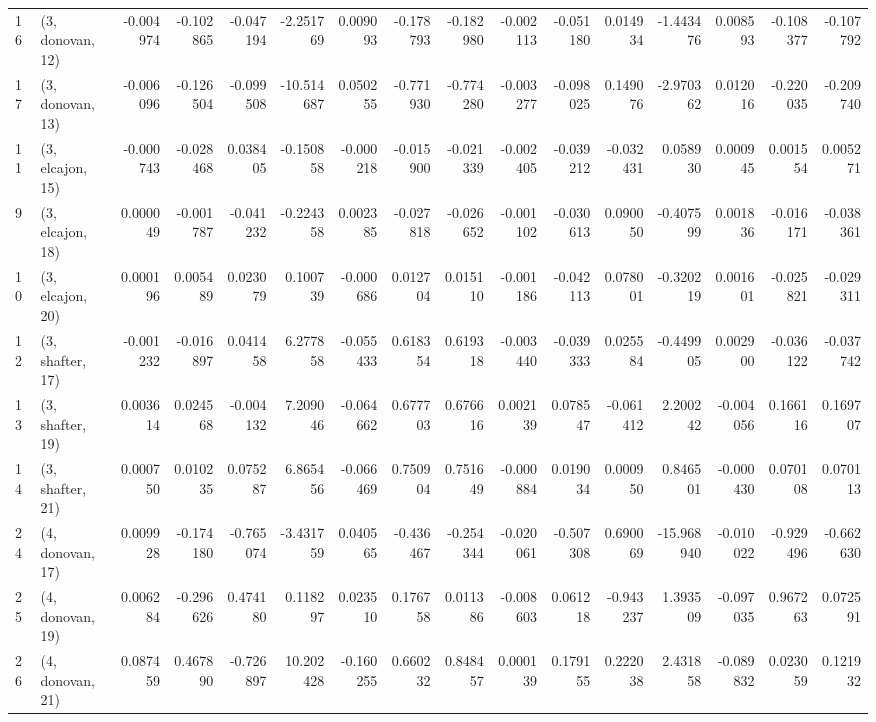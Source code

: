 \begin{tabular}{llrrrrrrrrrrrrrr}
16 &  (3, donovan, 12) &  -0.004974 & -0.102865 & -0.047194 &  -2.251769 &  0.009093 &  -0.178793 & -0.182980 & -0.002113 & -0.051180 &  0.014934 &  -1.443476 &  0.008593 & -0.108377 & -0.107792 \\
17 &  (3, donovan, 13) &  -0.006096 & -0.126504 & -0.099508 & -10.514687 &  0.050255 &  -0.771930 & -0.774280 & -0.003277 & -0.098025 &  0.149076 &  -2.970362 &  0.012016 & -0.220035 & -0.209740 \\
11 &  (3, elcajon, 15) &  -0.000743 & -0.028468 &  0.038405 &  -0.150858 & -0.000218 &  -0.015900 & -0.021339 & -0.002405 & -0.039212 & -0.032431 &   0.058930 &  0.000945 &  0.001554 &  0.005271 \\
9  &  (3, elcajon, 18) &   0.000049 & -0.001787 & -0.041232 &  -0.224358 &  0.002385 &  -0.027818 & -0.026652 & -0.001102 & -0.030613 &  0.090050 &  -0.407599 &  0.001836 & -0.016171 & -0.038361 \\
10 &  (3, elcajon, 20) &   0.000196 &  0.005489 &  0.023079 &   0.100739 & -0.000686 &   0.012704 &  0.015110 & -0.001186 & -0.042113 &  0.078001 &  -0.320219 &  0.001601 & -0.025821 & -0.029311 \\
12 &  (3, shafter, 17) &  -0.001232 & -0.016897 &  0.041458 &   6.277858 & -0.055433 &   0.618354 &  0.619318 & -0.003440 & -0.039333 &  0.025584 &  -0.449905 &  0.002900 & -0.036122 & -0.037742 \\
13 &  (3, shafter, 19) &   0.003614 &  0.024568 & -0.004132 &   7.209046 & -0.064662 &   0.677703 &  0.676616 &  0.002139 &  0.078547 & -0.061412 &   2.200242 & -0.004056 &  0.166116 &  0.169707 \\
14 &  (3, shafter, 21) &   0.000750 &  0.010235 &  0.075287 &   6.865456 & -0.066469 &   0.750904 &  0.751649 & -0.000884 &  0.019034 &  0.000950 &   0.846501 & -0.000430 &  0.070108 &  0.070113 \\
24 &  (4, donovan, 17) &   0.009928 & -0.174180 & -0.765074 &  -3.431759 &  0.040565 &  -0.436467 & -0.254344 & -0.020061 & -0.507308 &  0.690069 & -15.968940 & -0.010022 & -0.929496 & -0.662630 \\
25 &  (4, donovan, 19) &   0.006284 & -0.296626 &  0.474180 &   0.118297 &  0.023510 &   0.176758 &  0.011386 & -0.008603 &  0.061218 & -0.943237 &   1.393509 & -0.097035 &  0.967263 &  0.072591 \\
26 &  (4, donovan, 21) &   0.087459 &  0.467890 & -0.726897 &  10.202428 & -0.160255 &   0.660232 &  0.848457 &  0.000139 &  0.179155 &  0.222038 &   2.431858 & -0.089832 &  0.023059 &  0.121932 \\

\end{tabular}
